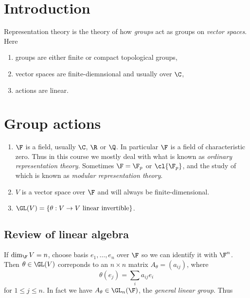 \documentclass[a4paper]{article}
\begin{document}


\tableofcontents

\setcounter{section}{-1}

\section{Introduction}

Representation theory is the theory of how \emph{groups} act as groups on \emph{vector spaces}. Here
\begin{enumerate}
\item groups are either finite or compact topological groups,
\item vector spaces are finite-diemnsional and usually over \(\C\),
\item actions are linear. 
\end{enumerate}

\section{Group actions}

\begin{notation}\leavevmode
  \begin{enumerate}
  \item \(\F\) is a field, usually \(\C\), \(\R\) or \(\Q\). In particular \(\F\) is a field of characteristic zero. Thus in this course we mostly deal with what is known as \emph{ordinary representation theory}. Sometimes \(\F = \F_p\) or \(\cl{\F_p}\), and the study of which is known as \emph{modular representation theory}.
  \item \(V\) is a vector space over \(\F\) and will always be finite-dimensional.
  \item \(\GL(V) = \{\theta: V \to V \text{ linear invertible}\}\).
  \end{enumerate}
\end{notation}

\subsection{Review of linear algebra}

If \(\dim_\F V = n\), choose basis \(e_1, \dots, e_n\) over \(\F\) so we can identify it with \(\F^n\). Then \(\theta \in \GL(V)\) correponds to an \(n \times n\) matrix \(A_\theta = (a_{ij})\), where
\[
  \theta(e_j) = \sum_i a_{ij} e_i
\]
for \(1 \leq j \leq n\). In fact we have \(A_\theta \in \GL_n(\F)\), the \emph{general linear group}. Thus
\end{document}
